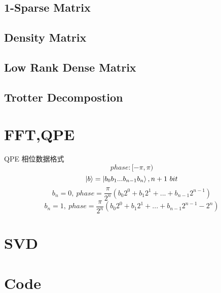 \documentclass{article}
\begin{document}
\subsection{1-Sparse Matrix}
\subsection{Density Matrix}
\subsection{Low Rank Dense Matrix}
\subsection{Trotter Decompostion}

\section{FFT,QPE}
QPE 相位数据格式
	$$phase:[-\pi,\pi)$$
	$$ \ket{b} = \ket{b_0b_1...b_{n-1}b_n}, n+1\ bit$$
	$$b_n =0,	\  phase= \frac{\pi}{2^{n}} (b_0 2^0 + b_1 2^1+ ... + b_{n-1} 2^{n-1})  $$
    $$b_n =1,	\  phase= \frac{\pi}{2^{n}} (b_0 2^0 + b_1 2^1+ ... + b_{n-1} 2^{n-1}-2^{n})  $$

\section{SVD}

\section{Code}
\end{document}
